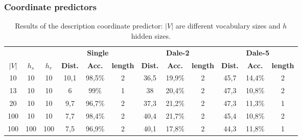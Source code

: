 \subsubsection{Coordinate predictors}
\begin{table}[h]
    \centering
    \begin{tabular}{ccc|ccc|ccc|ccc}
        \toprule
              &         &         & \multicolumn{3}{c}{\textbf{Single}} & \multicolumn{3}{c}{\textbf{Dale-2}} & \multicolumn{3}{c}{\textbf{Dale-5}}                                                                                                       \\\cmidrule(lr){4-6}\cmidrule(lr){7-9}\cmidrule(lr){10-12}
        $|V|$ & $h_{s}$ & $h_{r}$ & \textbf{Dist.}                      & \textbf{Acc.}                       & \textbf{length}                     & \textbf{Dist.} & \textbf{Acc.} & \textbf{length} & \textbf{Dist.} & \textbf{Acc.} & \textbf{length} \\\midrule
        {10}  & {10}    & {10}    & {10,1}                              & {98,5\%}                            & {2}                                 & {36,5}         & {19,9\%}      & {2}             & {45,7}         & {14,4\%}      & {2}             \\
        {13}  & {10}    & {10}    & {6}                                 & {99\%}                              & {1}                                 & {38}           & {20,4\%}      & {2}             & {47,3}         & {10,8\%}      & {2}             \\
        {20}  & {10}    & {10}    & {9,7}                               & {96,7\%}                            & {2}                                 & {37,3}         & {21,2\%}      & {2}             & {47,3}         & {11,3\%}      & {1}             \\
        {100} & {10}    & {10}    & {7,7}                               & {98,4\%}                            & {2}                                 & {40,4}         & {21,7\%}      & {2}             & {45,4}         & {10,8\%}      & {2}             \\
        {100} & {100}   & {100}   & {7,5}                               & {96,9\%}                            & {2}                                 & {40,1}         & {17,8\%}      & {2}             & {44,3}         & {11,8\%}      & {1}             \\
        \bottomrule
    \end{tabular}
    \caption{Results of the description coordinate predictor: $|V|$ are different vocabulary sizes and $h$ hidden sizes.}
    \label{tab:results_dale_predictor_game}
\end{table}

